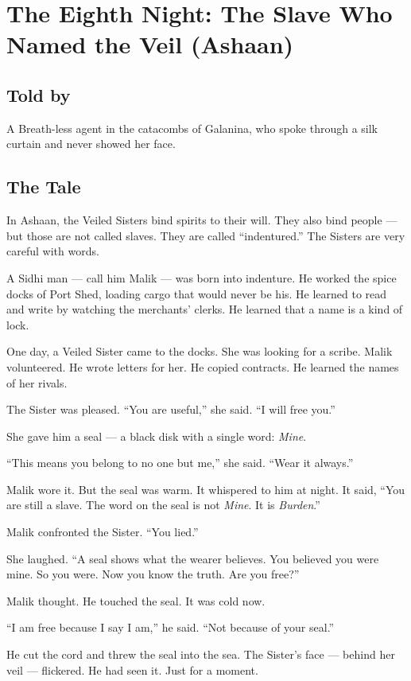 \documentclass[10pt,twoside]{book}
\begin{document}
\chapter{The Eighth Night: The Slave Who Named the Veil (Ashaan)}

\section*{Told by}
A Breath-less agent in the catacombs of Galanina, who spoke through a silk curtain and never showed her face.

\section*{The Tale}
In Ashaan, the Veiled Sisters bind spirits to their will. They also bind people --- but those are not called slaves. They are called ``indentured.'' The Sisters are very careful with words.

A Sidhi man --- call him Malik --- was born into indenture. He worked the spice docks of Port Shed, loading cargo that would never be his. He learned to read and write by watching the merchants' clerks. He learned that a name is a kind of lock.

One day, a Veiled Sister came to the docks. She was looking for a scribe. Malik volunteered. He wrote letters for her. He copied contracts. He learned the names of her rivals.

The Sister was pleased. ``You are useful,'' she said. ``I will free you.''

She gave him a seal --- a black disk with a single word: \textit{Mine}.

``This means you belong to no one but me,'' she said. ``Wear it always.''

Malik wore it. But the seal was warm. It whispered to him at night. It said, ``You are still a slave. The word on the seal is not \textit{Mine}. It is \textit{Burden}.''

Malik confronted the Sister. ``You lied.''

She laughed. ``A seal shows what the wearer believes. You believed you were mine. So you were. Now you know the truth. Are you free?''

Malik thought. He touched the seal. It was cold now.

``I am free because I say I am,'' he said. ``Not because of your seal.''

He cut the cord and threw the seal into the sea. The Sister's face --- behind her veil --- flickered. He had seen it. Just for a moment.
\end{document}
